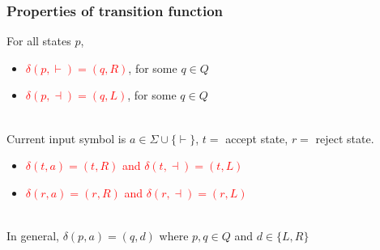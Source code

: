 \documentclass{beamer}
\begin{document}
\begin{frame}
\frametitle{Properties of transition function}

For all states $p$,
\begin{itemize}
\item \textcolor{red}{$\delta(p,\vdash) = (q,R)$}, for some $q \in Q$ 
\item \textcolor{red}{$\delta(p, \dashv) = (q, L)$}, for some $q \in Q $
\end{itemize}
\hspace*{1cm}\\
Current input symbol is $a \in \Sigma \cup \{\vdash\}$, $t =$ accept state, $r =$ reject state.
\begin{itemize}
\item \textcolor{red}{$\delta(t,a) = (t,R)$ and $\delta(t,\dashv) = (t,L)$} 
\item \textcolor{red}{$\delta(r,a) = (r,R)$ and $\delta(r,\dashv) = (r,L)$}
\end{itemize}
\hspace*{1cm}\\
 In general, $\delta(p,a) = (q,d)$ where $p,q \in Q$ and $d \in \{L,R\}$

\end{frame}

\end{document}
